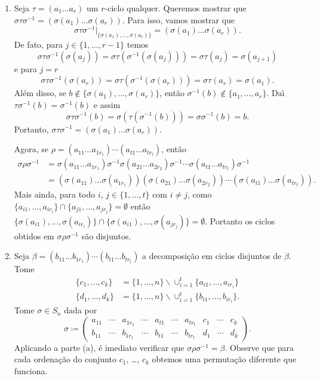 \begin{prova}
	\begin{enumerate}
		\item Seja $\tau = (a_1 \dots a_r)$ um $r$-ciclo qualquer. Queremos mostrar que $\sigma\tau\sigma^{-1} = (\sigma(a_1)\dots\sigma(a_r))$. Para isso, vamos mostrar que
		\[
			\sigma\tau\sigma^{-1}|_{\{\sigma(a_1),\dots,\sigma(a_r)\}} = (\sigma(a_1)\dots\sigma(a_r)).
		\]
		De fato, para $j \in \{1, \dots, r - 1\}$ temos
		\[
			\sigma\tau\sigma^{-1}(\sigma(a_j)) = \sigma\tau(\sigma^{-1}(\sigma(a_j))) = \sigma\tau(a_j) = \sigma(a_{j + 1})
		\]
		e para $j = r$
		\[
			\sigma\tau\sigma^{-1}(\sigma(a_r)) = \sigma\tau(\sigma^{-1}(\sigma(a_r))) = \sigma\tau(a_r) = \sigma(a_1).
		\]
		Al\'em disso, se $b \notin \{\sigma(a_1), \dots, \sigma(a_r)\}$, ent\~ao $\sigma^{-1}(b) \notin \{a_1, \dots, a_r\}$. Da{\'\i} $\tau\sigma^{-1}(b) = \sigma^{-1}(b)$ e assim
		\[
			\sigma\tau\sigma^{-1}(b) = \sigma(\tau(\sigma^{-1}(b))) = \sigma\sigma^{-1}(b) = b.
		\]
		Portanto, $\sigma\tau\sigma^{-1} = (\sigma(a_1)\dots \sigma(a_r))$.

		Agora, se $\rho = (a_{11}\dots a_{1r_1})\cdots (a_{t1}\dots a_{tr_t})$, ent\~ao
		\begin{align*}
			\sigma\rho\sigma^{-1} &= \sigma(a_{11}\dots a_{1r_1})\sigma^{-1}\sigma(a_{21}\dots a_{2r_2})\sigma^{-1}\cdots \sigma(a_{t1}\dots a_{tr_t})\sigma^{-1}\\ &= (\sigma(a_{11})\dots \sigma(a_{1r_1}))(\sigma(a_{21})\dots \sigma(a_{2r_2}))\cdots (\sigma(a_{t1})\dots \sigma(a_{tr_t})).
		\end{align*}
		Mais ainda, para todo $i$, $j \in \{1, \dots, t\}$ com $i \ne j$, como $\{a_{i1}, \dots, a_{ir_i}\} \cap \{a_{j1}, \dots, a_{jr_j}\} = \emptyset$ ent\~ao $\{\sigma(a_{i1}), \dots, \sigma(a_{ir_i})\} \cap \{\sigma(a_{i1}), \dots, \sigma(a_{jr_j})\} = \emptyset$. Portanto os ciclos obtidos em $\sigma\rho\sigma^{-1}$ s\~ao disjuntos.

		\item Seja $\beta = (b_{11}\dots b_{1r_1})\cdots (b_{t1}\dots b_{tr_t})$ a decomposi\c{c}\~ao em ciclos disjuntos de $\beta$. Tome
		\begin{align*}
			\{c_1, \dots, c_k\} &= \{1, \dots, n\}\backslash \cup_{i = 1}^t\{a_{i1}, \dots, a_{ir_i}\}\\
			\{d_1, \dots, d_k\} &= \{1, \dots, n\}\backslash \cup_{i = 1}^t\{b_{i1}, \dots, b_{ir_i}\}.
		\end{align*}
		Tome $\sigma \in S_n$ dada por
		\[
			\sigma \coloneqq \begin{pmatrix}
				a_{11} & \cdots & a_{1r_1} & \cdots & a_{t1} & \cdots  & a_{tr_t} & c_1 & \cdots & c_k\\
				b_{11} & \cdots & b_{1r_1} & \cdots & b_{t1} & \cdots & b_{tr_t} & d_1 & \cdots & d_k
			\end{pmatrix}.
		\]
		Aplicando a parte (a), \'e imediato verificar que $\sigma\rho\sigma^{-1} = \beta$. Observe que para cada ordena\c{c}\~ao do conjunto $c_1$, \dots, $c_k$ obtemos uma permuta\c{c}\~ao diferente que funciona.


\end{enumerate}
\end{prova}
